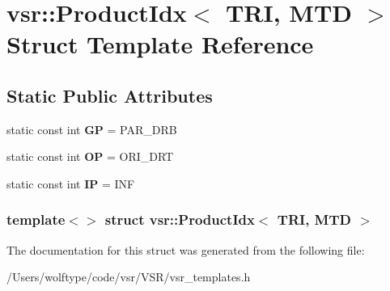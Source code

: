 \hypertarget{structvsr_1_1_product_idx_3_01_t_r_i_00_01_m_t_d_01_4}{\section{vsr\-:\-:Product\-Idx$<$ T\-R\-I, M\-T\-D $>$ Struct Template Reference}
\label{structvsr_1_1_product_idx_3_01_t_r_i_00_01_m_t_d_01_4}
}
\subsection*{Static Public Attributes}
\begin{DoxyCompactItemize}
\item 
\hypertarget{structvsr_1_1_product_idx_3_01_t_r_i_00_01_m_t_d_01_4_a55e9c38f7a8a33cd96ef810ba7713076}{static const int {\bfseries G\-P} = P\-A\-R\-\_\-\-D\-R\-B}\label{structvsr_1_1_product_idx_3_01_t_r_i_00_01_m_t_d_01_4_a55e9c38f7a8a33cd96ef810ba7713076}

\item 
\hypertarget{structvsr_1_1_product_idx_3_01_t_r_i_00_01_m_t_d_01_4_a8b0b6310c9a3382f571a4df70f82fcf2}{static const int {\bfseries O\-P} = O\-R\-I\-\_\-\-D\-R\-T}\label{structvsr_1_1_product_idx_3_01_t_r_i_00_01_m_t_d_01_4_a8b0b6310c9a3382f571a4df70f82fcf2}

\item 
\hypertarget{structvsr_1_1_product_idx_3_01_t_r_i_00_01_m_t_d_01_4_ae2e1aebdb449b6d707704fa8f5d6d180}{static const int {\bfseries I\-P} = I\-N\-F}\label{structvsr_1_1_product_idx_3_01_t_r_i_00_01_m_t_d_01_4_ae2e1aebdb449b6d707704fa8f5d6d180}

\end{DoxyCompactItemize}
\subsubsection*{template$<$$>$ struct vsr\-::\-Product\-Idx$<$ T\-R\-I, M\-T\-D $>$}



The documentation for this struct was generated from the following file\-:\begin{DoxyCompactItemize}
\item 
/\-Users/wolftype/code/vsr/\-V\-S\-R/vsr\-\_\-templates.\-h\end{DoxyCompactItemize}
